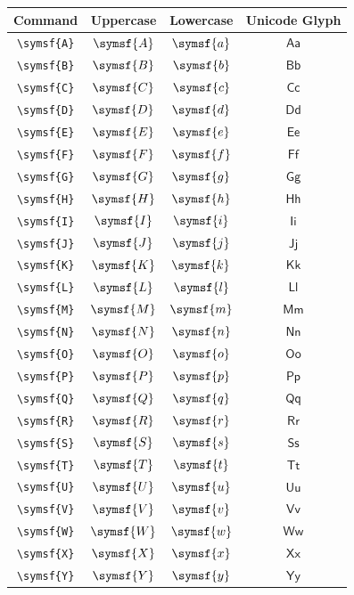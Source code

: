 \documentclass[12pt,a4paper]{article}
\begin{document}
\begin{longtable}{|c|c|c|c|}
\hline
\textbf{Command} & \textbf{Uppercase} & \textbf{Lowercase} & \textbf{Unicode Glyph} \\
\hline
\verb|\symsf{A}| & $\symsf{A}$ & $\symsf{a}$ & $ 𝖠 𝖺 $ \\
\verb|\symsf{B}| & $\symsf{B}$ & $\symsf{b}$ & $ 𝖡 𝖻 $ \\
\verb|\symsf{C}| & $\symsf{C}$ & $\symsf{c}$ & $ 𝖢 𝖼 $ \\
\verb|\symsf{D}| & $\symsf{D}$ & $\symsf{d}$ & $ 𝖣 𝖽 $ \\
\verb|\symsf{E}| & $\symsf{E}$ & $\symsf{e}$ & $ 𝖤 𝖾 $ \\
\verb|\symsf{F}| & $\symsf{F}$ & $\symsf{f}$ & $ 𝖥 𝖿 $ \\
\verb|\symsf{G}| & $\symsf{G}$ & $\symsf{g}$ & $ 𝖦 𝗀 $ \\
\verb|\symsf{H}| & $\symsf{H}$ & $\symsf{h}$ & $ 𝖧 𝗁 $ \\
\verb|\symsf{I}| & $\symsf{I}$ & $\symsf{i}$ & $ 𝖨 𝗂 $ \\
\verb|\symsf{J}| & $\symsf{J}$ & $\symsf{j}$ & $ 𝖩 𝗃 $ \\
\verb|\symsf{K}| & $\symsf{K}$ & $\symsf{k}$ & $ 𝖪 𝗄 $ \\
\verb|\symsf{L}| & $\symsf{L}$ & $\symsf{l}$ & $ 𝖫 𝗅 $ \\
\verb|\symsf{M}| & $\symsf{M}$ & $\symsf{m}$ & $ 𝖬 𝗆 $ \\
\verb|\symsf{N}| & $\symsf{N}$ & $\symsf{n}$ & $ 𝖭 𝗇 $ \\
\verb|\symsf{O}| & $\symsf{O}$ & $\symsf{o}$ & $ 𝖮 𝗈 $ \\
\verb|\symsf{P}| & $\symsf{P}$ & $\symsf{p}$ & $ 𝖯 𝗉 $ \\
\verb|\symsf{Q}| & $\symsf{Q}$ & $\symsf{q}$ & $ 𝖰 𝗊 $ \\
\verb|\symsf{R}| & $\symsf{R}$ & $\symsf{r}$ & $ 𝖱 𝗋 $ \\
\verb|\symsf{S}| & $\symsf{S}$ & $\symsf{s}$ & $ 𝖲 𝗌 $ \\
\verb|\symsf{T}| & $\symsf{T}$ & $\symsf{t}$ & $ 𝖳 𝗍 $ \\
\verb|\symsf{U}| & $\symsf{U}$ & $\symsf{u}$ & $ 𝖴 𝗎 $ \\
\verb|\symsf{V}| & $\symsf{V}$ & $\symsf{v}$ & $ 𝖵 𝗏 $ \\
\verb|\symsf{W}| & $\symsf{W}$ & $\symsf{w}$ & $ 𝖶 𝗐 $ \\
\verb|\symsf{X}| & $\symsf{X}$ & $\symsf{x}$ & $ 𝖷 𝗑 $ \\
\verb|\symsf{Y}| & $\symsf{Y}$ & $\symsf{y}$ & $ 𝖸 𝗒 $ \\

\end{longtable}
\end{document}
